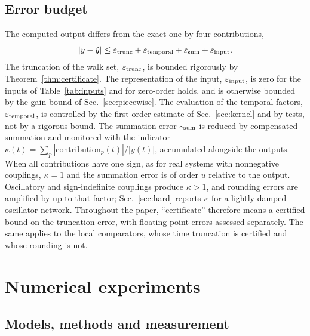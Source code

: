 \documentclass[aps,pra,superscriptaddress,floatfix,longbibliography,twocolumn]{revtex4-2}
\begin{document}
\subsection{Error budget}\label{sec:budget}
The computed output differs from the exact one by four contributions,
\begin{equation}\label{eq:budget}
|y-\hat y|\le\varepsilon_{\rm trunc}+\varepsilon_{\rm temporal}+\varepsilon_{\rm sum}+\varepsilon_{\rm input}.
\end{equation}
The truncation of the walk set, $\varepsilon_{\rm trunc}$, is bounded rigorously by Theorem~\ref{thm:certificate}. The representation of the input, $\varepsilon_{\rm input}$, is zero for the inputs of Table~\ref{tab:inputs} and for zero-order holds, and is otherwise bounded by the gain bound of Sec.~\ref{sec:piecewise}. The evaluation of the temporal factors, $\varepsilon_{\rm temporal}$, is controlled by the first-order estimate of Sec.~\ref{sec:kernel} and by tests, not by a rigorous bound. The summation error $\varepsilon_{\rm sum}$ is reduced by compensated summation and monitored with the indicator $\kappa(t)=\sum_p|\text{contribution}_p(t)|/|y(t)|$, accumulated alongside the outputs. When all contributions have one sign, as for real systems with nonnegative couplings, $\kappa=1$ and the summation error is of order $u$ relative to the output. Oscillatory and sign-indefinite couplings produce $\kappa>1$, and rounding errors are amplified by up to that factor; Sec.~\ref{sec:hard} reports $\kappa$ for a lightly damped oscillator network. Throughout the paper, ``certificate'' therefore means a certified bound on the truncation error, with floating-point errors assessed separately. The same applies to the local comparators, whose time truncation is certified and whose rounding is not.
\section{Numerical experiments}\label{sec:numerics}

\subsection{Models, methods and measurement}\label{sec:setup}
\end{document}
